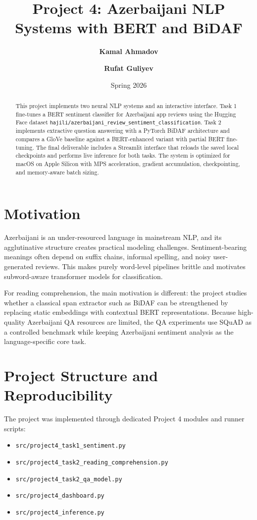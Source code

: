 \documentclass[11pt]{article}
\title{Project 4: Azerbaijani NLP Systems with BERT and BiDAF}
\author{\textbf{Kamal Ahmadov} \and \textbf{Rufat Guliyev}}
\date{Spring 2026}
\begin{document}
\maketitle

\begin{abstract}
This project implements two neural NLP systems and an interactive interface. Task 1 fine-tunes a BERT sentiment classifier for Azerbaijani app reviews using the Hugging Face dataset \texttt{hajili/azerbaijani\_review\_sentiment\_classification}. Task 2 implements extractive question answering with a PyTorch BiDAF architecture and compares a GloVe baseline against a BERT-enhanced variant with partial BERT fine-tuning. The final deliverable includes a Streamlit interface that reloads the saved local checkpoints and performs live inference for both tasks. The system is optimized for macOS on Apple Silicon with MPS acceleration, gradient accumulation, checkpointing, and memory-aware batch sizing.
\end{abstract}

\section{Motivation}
Azerbaijani is an under-resourced language in mainstream NLP, and its agglutinative structure creates practical modeling challenges. Sentiment-bearing meanings often depend on suffix chains, informal spelling, and noisy user-generated reviews. This makes purely word-level pipelines brittle and motivates subword-aware transformer models for classification.

For reading comprehension, the main motivation is different: the project studies whether a classical span extractor such as BiDAF can be strengthened by replacing static embeddings with contextual BERT representations. Because high-quality Azerbaijani QA resources are limited, the QA experiments use SQuAD as a controlled benchmark while keeping Azerbaijani sentiment analysis as the language-specific core task.

\section{Project Structure and Reproducibility}
The project was implemented through dedicated Project 4 modules and runner scripts:
\begin{itemize}
    \item \texttt{src/project4\_task1\_sentiment.py}
    \item \texttt{src/project4\_task2\_reading\_comprehension.py}
    \item \texttt{src/project4\_task2\_qa\_model.py}
    \item \texttt{src/project4\_dashboard.py}
    \item \texttt{src/project4\_inference.py}
\end{itemize}
\end{document}
